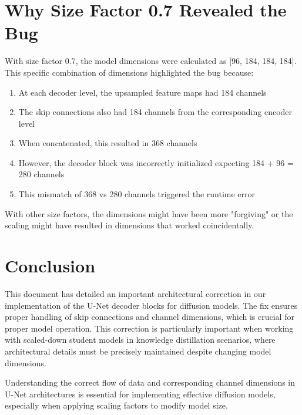 \documentclass{article}
\begin{document}
\section{Why Size Factor 0.7 Revealed the Bug}

With size factor 0.7, the model dimensions were calculated as [96, 184, 184, 184]. This specific combination of dimensions highlighted the bug because:

\begin{enumerate}
  \item At each decoder level, the upsampled feature maps had 184 channels
  \item The skip connections also had 184 channels from the corresponding encoder level
  \item When concatenated, this resulted in 368 channels
  \item However, the decoder block was incorrectly initialized expecting 184 + 96 = 280 channels
  \item This mismatch of 368 vs 280 channels triggered the runtime error
\end{enumerate}

With other size factors, the dimensions might have been more "forgiving" or the scaling might have resulted in dimensions that worked coincidentally.

\section{Conclusion}

This document has detailed an important architectural correction in our implementation of the U-Net decoder blocks for diffusion models. The fix ensures proper handling of skip connections and channel dimensions, which is crucial for proper model operation. This correction is particularly important when working with scaled-down student models in knowledge distillation scenarios, where architectural details must be precisely maintained despite changing model dimensions.

Understanding the correct flow of data and corresponding channel dimensions in U-Net architectures is essential for implementing effective diffusion models, especially when applying scaling factors to modify model size.
\end{document}
